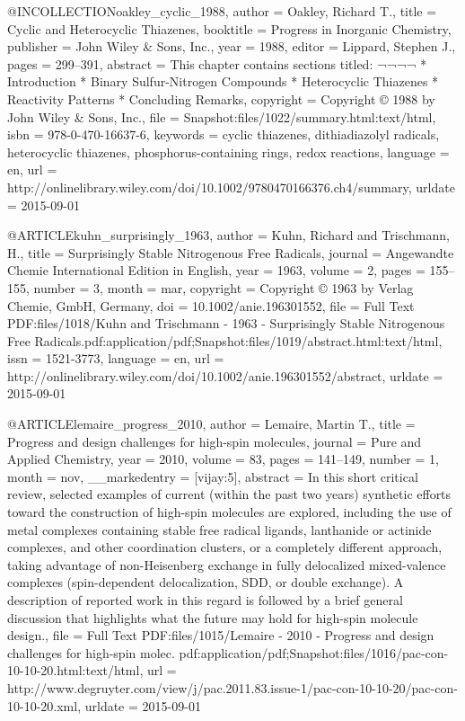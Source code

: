 @INCOLLECTION{oakley_cyclic_1988,
  author = {Oakley, Richard T.},
  title = {Cyclic and {Heterocyclic} {Thiazenes}},
  booktitle = {Progress in {Inorganic} {Chemistry}},
  publisher = {John Wiley \& Sons, Inc.},
  year = {1988},
  editor = {Lippard, Stephen J.},
  pages = {299--391},
  abstract = {This chapter contains sections titled: ¬¬¬¬ * Introduction * Binary
	Sulfur-Nitrogen Compounds * Heterocyclic Thiazenes * Reactivity Patterns
	* Concluding Remarks},
  copyright = {Copyright © 1988 by John Wiley \& Sons, Inc.},
  file = {Snapshot:files/1022/summary.html:text/html},
  isbn = {978-0-470-16637-6},
  keywords = {cyclic thiazenes, dithiadiazolyl radicals, heterocyclic thiazenes,
	phosphorus-containing rings, redox reactions},
  language = {en},
  url = {http://onlinelibrary.wiley.com/doi/10.1002/9780470166376.ch4/summary},
  urldate = {2015-09-01}
}

@ARTICLE{kuhn_surprisingly_1963,
  author = {Kuhn, Richard and Trischmann, H.},
  title = {Surprisingly {Stable} {Nitrogenous} {Free} {Radicals}},
  journal = {Angewandte Chemie International Edition in English},
  year = {1963},
  volume = {2},
  pages = {155--155},
  number = {3},
  month = mar,
  copyright = {Copyright © 1963 by Verlag Chemie, GmbH, Germany},
  doi = {10.1002/anie.196301552},
  file = {Full Text PDF:files/1018/Kuhn and Trischmann - 1963 - Surprisingly Stable Nitrogenous Free    Radicals.pdf:application/pdf;Snapshot:files/1019/abstract.html:text/html},
  issn = {1521-3773},
  language = {en},
  url = {http://onlinelibrary.wiley.com/doi/10.1002/anie.196301552/abstract},
  urldate = {2015-09-01}
}

@ARTICLE{lemaire_progress_2010,
  author = {Lemaire, Martin T.},
  title = {Progress and design challenges for high-spin molecules},
  journal = {Pure and Applied Chemistry},
  year = {2010},
  volume = {83},
  pages = {141--149},
  number = {1},
  month = nov,
  __markedentry = {[vijay:5]},
  abstract = {In this short critical review, selected examples of current (within
	the past two years) synthetic efforts toward the construction of
	high-spin molecules are explored, including the use of metal complexes
	containing stable free radical ligands, lanthanide or actinide complexes,
	and other coordination clusters, or a completely different approach,
	taking advantage of non-Heisenberg exchange in fully delocalized
	mixed-valence complexes (spin-dependent delocalization, SDD, or double
	exchange). A description of reported work in this regard is followed
	by a brief general discussion that highlights what the future may
	hold for high-spin molecule design.},
  file = {Full Text PDF:files/1015/Lemaire - 2010 - Progress and design challenges for high-spin molec. pdf:application/pdf;Snapshot:files/1016/pac-con-10-10-20.html:text/html},
  url = {http://www.degruyter.com/view/j/pac.2011.83.issue-1/pac-con-10-10-20/pac-con-10-10-20.xml},
  urldate = {2015-09-01}
}

